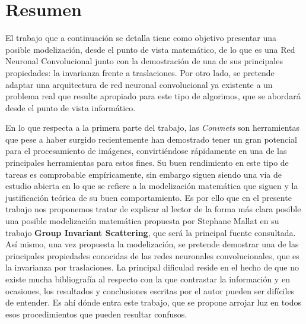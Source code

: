 %


\chapter{Resumen}

\noindent El trabajo que a continuación se detalla tiene como objetivo presentar una posible modelización, desde el punto de vista matemático, de lo que es una Red Neuronal Convolucional junto con la demostración de una de sus principales propiedades: la invarianza frente a traslaciones. Por otro lado, se pretende adaptar una arquitectura de red neuronal convolucional ya existente a un problema real que resulte apropiado para este tipo de algorimos, que se abordará desde el punto de vista informático.

\medskip

\noindent En lo que respecta a la primera parte del trabajo, las \textit{Convnets} son herramientas que pese a haber surgido recientemente han demostrado tener un gran potencial para el procesamiento de imágenes, convirtiéndose rápidamente en una de las principales herramientas para estos fines. Su buen rendimiento en este tipo de tareas es comprobable empíricamente, sin embargo siguen siendo una vía de estudio abierta en lo que se refiere a la modelización matemática que siguen y la justificación teórica de su buen comportamiento. Es por ello que en el presente trabajo nos proponemos tratar de explicar al lector de la forma más clara posible una posible modelización matemática propuesta por Stephane Mallat en su trabajo \textbf{Group Invariant Scattering}, que será la principal fuente consultada. Así mismo, una vez propuesta la modelización, se pretende demostrar una de las principales propiedades conocidas de las redes neuronales convolucionales, que es la invarianza por traslaciones. La principal dificulad reside en el hecho de que no existe mucha bibliografía al respecto con la que contrastar la información y en ocasiones, los resultados y conclusiones escritas por el autor pueden ser difíciles de entender. Es ahí dónde entra este trabajo, que se propone arrojar luz en todos esos procedimientos que pueden resultar confusos.


